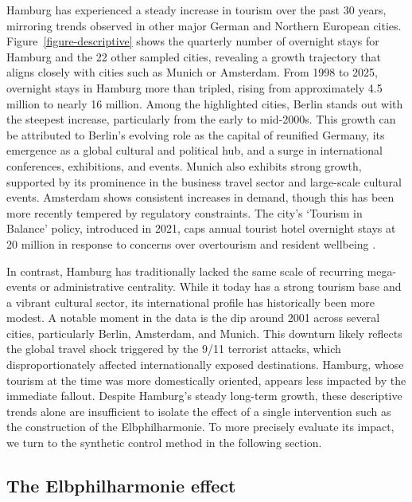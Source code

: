 \documentclass[a4paper, 12pt]{article}
\begin{document}
Hamburg has experienced a steady increase in tourism over the past 30 years, mirroring trends observed in other major German and Northern European cities. Figure~\ref{figure-descriptive} shows the quarterly number of overnight stays for Hamburg and the 22 other sampled cities, revealing a growth trajectory that aligns closely with cities such as Munich or Amsterdam. From 1998 to 2025, overnight stays in Hamburg more than tripled, rising from approximately 4.5 million to nearly 16 million. Among the highlighted cities, Berlin stands out with the steepest increase, particularly from the early to mid-2000s. This growth can be attributed to Berlin's evolving role as the capital of reunified Germany, its emergence as a global cultural and political hub, and a surge in international conferences, exhibitions, and events. Munich also exhibits strong growth, supported by its prominence in the business travel sector and large-scale cultural events. Amsterdam shows consistent increases in demand, though this has been more recently tempered by regulatory constraints. The city's `Tourism in Balance' policy, introduced in 2021, caps annual tourist hotel overnight stays at 20 million in response to concerns over overtourism and resident wellbeing \citep{cityofamsterdam2025}.

In contrast, Hamburg has traditionally lacked the same scale of recurring mega-events or administrative centrality. While it today has a strong tourism base and a vibrant cultural sector, its international profile has historically been more modest. A notable moment in the data is the dip around 2001 across several cities, particularly Berlin, Amsterdam, and Munich. This downturn likely reflects the global travel shock triggered by the 9/11 terrorist attacks, which disproportionately affected internationally exposed destinations. Hamburg, whose tourism at the time was more domestically oriented, appears less impacted by the immediate fallout. Despite Hamburg's steady long-term growth, these descriptive trends alone are insufficient to isolate the effect of a single intervention such as the construction of the Elbphilharmonie. To more precisely evaluate its impact, we turn to the synthetic control method in the following section.


\subsection{The Elbphilharmonie effect}
\end{document}
